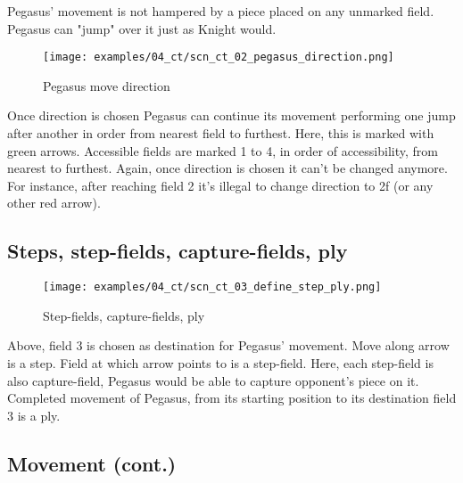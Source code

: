 Pegasus' movement is not hampered by a piece placed on any unmarked field.
Pegasus can "jump" over it just as Knight would.

\clearpage %

\noindent
\begin{figure}[!h]
\texttt{[image: examples/04\_ct/scn\_ct\_02\_pegasus\_direction.png]}
\caption{Pegasus move direction}
\label{fig:scn_ct_02_pegasus_direction}
\end{figure}

Once direction is chosen Pegasus can continue its movement performing one jump
after another in order from nearest field to furthest. Here, this is marked
with green arrows. Accessible fields are marked 1 to 4, in order of accessibility,
from nearest to furthest. Again, once direction is chosen it can't be changed anymore.
For instance, after reaching field 2 it's illegal to change direction to 2f (or
any other red arrow).

\clearpage %

\subsection*{Steps, step-fields, capture-fields, ply}
\label{sec:Croatian Ties/Pegasus/Steps, step-fields, capture-fields, ply}

\noindent
\begin{figure}[!h]
\vspace{-1.0\baselineskip}
\texttt{[image: examples/04\_ct/scn\_ct\_03\_define\_step\_ply.png]}
\caption{Step-fields, capture-fields, ply}
\label{fig:scn_ct_03_define_step_ply}
\end{figure}

Above, field 3 is chosen as destination for Pegasus' movement. Move along arrow is a step.
Field at which arrow points to is a step-field. Here, each step-field is also capture-field,
Pegasus would be able to capture opponent's piece on it. Completed movement of Pegasus,
from its starting position to its destination field 3 is a ply.

\clearpage %

\subsection*{Movement (cont.)}
\label{sec:Croatian Ties/Pegasus/Movement (cont.)}

